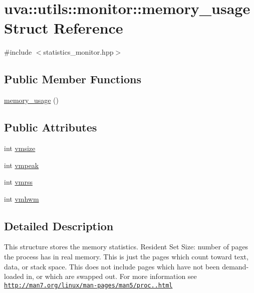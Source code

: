 \hypertarget{structuva_1_1utils_1_1monitor_1_1memory__usage}{}\section{uva\+:\+:utils\+:\+:monitor\+:\+:memory\+\_\+usage Struct Reference}
\label{structuva_1_1utils_1_1monitor_1_1memory__usage}


{\ttfamily \#include $<$statistics\+\_\+monitor.\+hpp$>$}

\subsection*{Public Member Functions}
\begin{DoxyCompactItemize}
\item 
\hyperlink{structuva_1_1utils_1_1monitor_1_1memory__usage_ad03021f160590255f60451fe5f18603b}{memory\+\_\+usage} ()
\end{DoxyCompactItemize}
\subsection*{Public Attributes}
\begin{DoxyCompactItemize}
\item 
int \hyperlink{structuva_1_1utils_1_1monitor_1_1memory__usage_aa51584de084fc380578c457096a395ff}{vmsize}
\item 
int \hyperlink{structuva_1_1utils_1_1monitor_1_1memory__usage_a7145c69ae9c7f75c38cd9a92df74f0e9}{vmpeak}
\item 
int \hyperlink{structuva_1_1utils_1_1monitor_1_1memory__usage_ab032109442efa2c08bd3085e562fc940}{vmrss}
\item 
int \hyperlink{structuva_1_1utils_1_1monitor_1_1memory__usage_a07b4f8b87babf609be5fdf760cad236a}{vmhwm}
\end{DoxyCompactItemize}


\subsection{Detailed Description}
This structure stores the memory statistics. Resident Set Size\+: number of pages the process has in real memory. This is just the pages which count toward text, data, or stack space. This does not include pages which have not been demand-\/loaded in, or which are swapped out. For more information see \href{http://man7.org/linux/man-pages/man5/proc.5.html}{\tt http\+://man7.\+org/linux/man-\/pages/man5/proc..\+html} 


